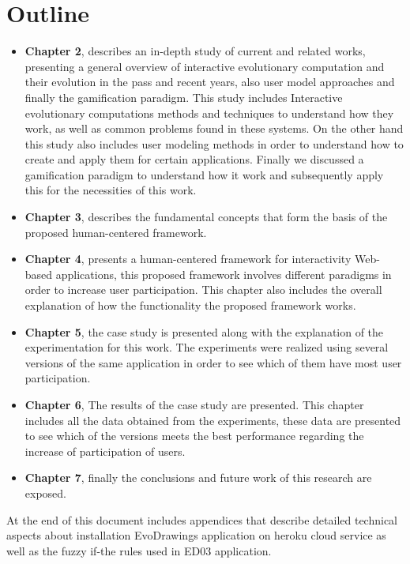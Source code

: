 \section{Outline}

\begin{itemize}
\item \textbf{Chapter 2}, describes an in-depth study of current and related
works, presenting a general overview of interactive evolutionary computation and
their evolution in the pass and recent years, also user model approaches and
finally the gamification paradigm. This study includes Interactive evolutionary
computations methods and techniques to understand how they work, as well as
common problems found in these systems. On the other hand this study also includes user
modeling methods in order to understand how to create and apply them for certain
applications. Finally we discussed a gamification paradigm to
understand how it work and subsequently apply this for the necessities of this
work.

\item \textbf{Chapter 3}, describes the fundamental
concepts that form the basis of the proposed human-centered framework.


\item \textbf{Chapter 4}, presents a human-centered framework for interactivity
Web-based applications, this proposed framework involves different paradigms in
order to increase user participation. This chapter also includes the overall
explanation of how the functionality the proposed framework works.

\item \textbf{Chapter 5}, the case study is presented along with the
explanation of the experimentation for this work. The experiments were realized
using several versions of the same application in order to see which of them
have most user participation.

\item \textbf{Chapter 6}, The results of the case study are presented. This
chapter includes all the data obtained from the experiments, these data are
presented to see which of the versions meets the best performance regarding the
increase of participation of users.

\item \textbf{Chapter 7}, finally the conclusions and future work of this
research are exposed.
\end{itemize}

At the end of this document includes appendices that describe
detailed technical aspects about installation EvoDrawings application on heroku
cloud service as well as the fuzzy if-the rules used in ED03 application.
